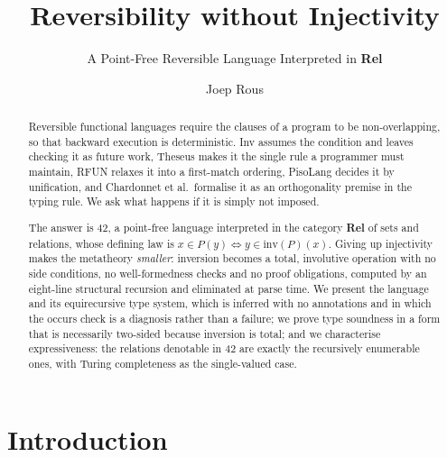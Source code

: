 \documentclass[runningheads,envcountsame]{llncs}
\newcommand{\Rel}{\textbf{Rel}}
\begin{document}
\title{Reversibility without Injectivity}
\subtitle{A Point-Free Reversible Language Interpreted in \textbf{Rel}}

\author{Joep Rous}

\maketitle

\begin{abstract}
Reversible functional languages require the clauses of a program to be
non-overlapping, so that backward execution is deterministic. Inv assumes the
condition and leaves checking it as future work, Theseus makes it the single rule
a programmer must maintain, RFUN relaxes it into a first-match ordering, PisoLang
decides it by unification, and Chardonnet et al.\ formalise it as an orthogonality
premise in the typing rule. We ask what happens if it is simply not imposed.

The answer is 42, a point-free language interpreted in the category \Rel{} of sets
and relations, whose defining law is $x \in P(y) \iff y \in \mathrm{inv}(P)(x)$.
Giving up injectivity makes the metatheory \emph{smaller}: inversion becomes a
total, involutive operation with no side conditions, no well-formedness checks and
no proof obligations, computed by an eight-line structural recursion and
eliminated at parse time. We present the language and its equirecursive type
system, which is inferred with no annotations and in which the occurs check is a
diagnosis rather than a failure; we prove type soundness in a form that is
necessarily two-sided because inversion is total; and we characterise
expressiveness: the relations denotable in 42 are exactly the recursively
enumerable ones, with Turing completeness as the single-valued case.

\end{abstract}

\section{Introduction}
\end{document}
